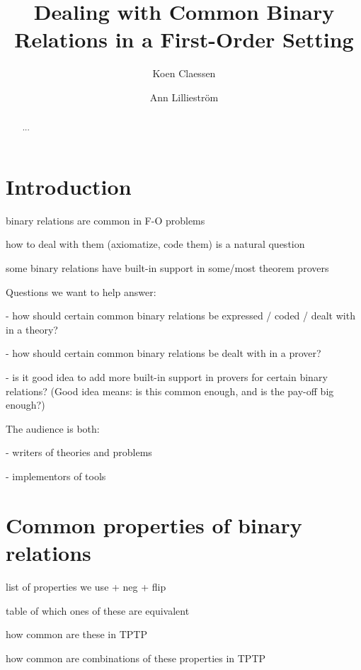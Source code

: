 \documentclass{easychair}
\title{Dealing with Common Binary Relations in a First-Order Setting}
\author{
  Koen Claessen
  \and 
  Ann Lilliestr{\"o}m
}
\institute{
  Chalmers University of Technology
  \email{\{koen,annl\}@chalmers.se}
}
\begin{document}
\maketitle


\begin{abstract}
...
\end{abstract}


\section{Introduction}

binary relations are common in F-O problems

how to deal with them (axiomatize, code them) is a natural question

some binary relations have built-in support in some/most theorem provers

Questions we want to help answer:

- how should certain common binary relations be expressed / coded / dealt with in a theory?

- how should certain common binary relations be dealt with in a prover?

- is it good idea to add more built-in support in provers for certain binary relations? (Good idea means: is this common enough, and is the pay-off big enough?)

The audience is both:

- writers of theories and problems

- implementors of tools


\section{Common properties of binary relations}

list of properties we use + neg + flip

table of which ones of these are equivalent

how common are these in TPTP

how common are combinations of these properties in TPTP
\end{document}
